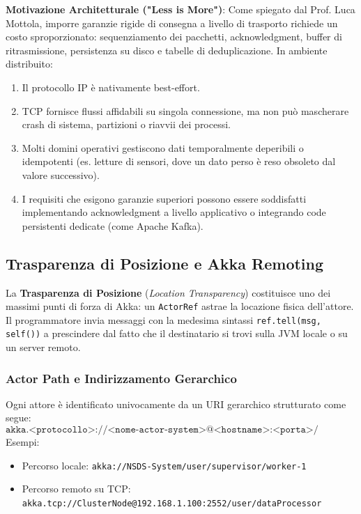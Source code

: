\textbf{Motivazione Architetturale ("Less is More")}:
Come spiegato dal Prof. Luca Mottola, imporre garanzie rigide di consegna a livello di trasporto richiede un costo sproporzionato: sequenziamento dei pacchetti, acknowledgment, buffer di ritrasmissione, persistenza su disco e tabelle di deduplicazione. In ambiente distribuito:
\begin{enumerate}
    \item Il protocollo IP è nativamente best-effort.
    \item TCP fornisce flussi affidabili su singola connessione, ma non può mascherare crash di sistema, partizioni o riavvii dei processi.
    \item Molti domini operativi gestiscono dati temporalmente deperibili o idempotenti (es. letture di sensori, dove un dato perso è reso obsoleto dal valore successivo).
    \item I requisiti che esigono garanzie superiori possono essere soddisfatti implementando acknowledgment a livello applicativo o integrando code persistenti dedicate (come Apache Kafka).
\end{enumerate}

\subsection{Trasparenza di Posizione e Akka Remoting}
La \textbf{Trasparenza di Posizione} (\textit{Location Transparency}) costituisce uno dei massimi punti di forza di Akka: un \texttt{ActorRef} astrae la locazione fisica dell'attore. Il programmatore invia messaggi con la medesima sintassi \texttt{ref.tell(msg, self())} a prescindere dal fatto che il destinatario si trovi sulla JVM locale o su un server remoto.

\subsubsection{Actor Path e Indirizzamento Gerarchico}
Ogni attore è identificato univocamente da un URI gerarchico strutturato come segue:
\begin{equation}
\texttt{akka.<protocollo>://<nome-actor-system>@<hostname>:<porta>/user/<percorso-gerarchico>}
\end{equation}
Esempi:
\begin{itemize}
    \item Percorso locale: \texttt{akka://NSDS-System/user/supervisor/worker-1}
    \item Percorso remoto su TCP: \texttt{akka.tcp://ClusterNode@192.168.1.100:2552/user/dataProcessor}
\end{itemize}

